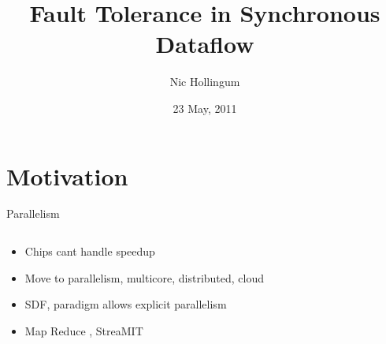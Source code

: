 \documentclass{beamer}
\title[SDF Crash Course]{Fault Tolerance in Synchronous Dataflow}
\author{Nic Hollingum}
\institute{USYD}
\date{23 May, 2011}
\begin{document}
\begin{frame}
\titlepage
\end{frame}

\section{Motivation}

\begin{frame}{Parallelism}
\begin{columns}
\begin{column}{6cm}
\begin{itemize}
	\item Chips cant handle speedup
	\item Move to parallelism, multicore, distributed, cloud
	\item SDF, paradigm allows explicit parallelism
	\item Map Reduce \cite{dea08}, StreaMIT \cite{thies02}
\end{itemize}
\end{column}
\begin{column}{4cm}
\end{column}
\end{columns}
\end{frame}
\end{document}

